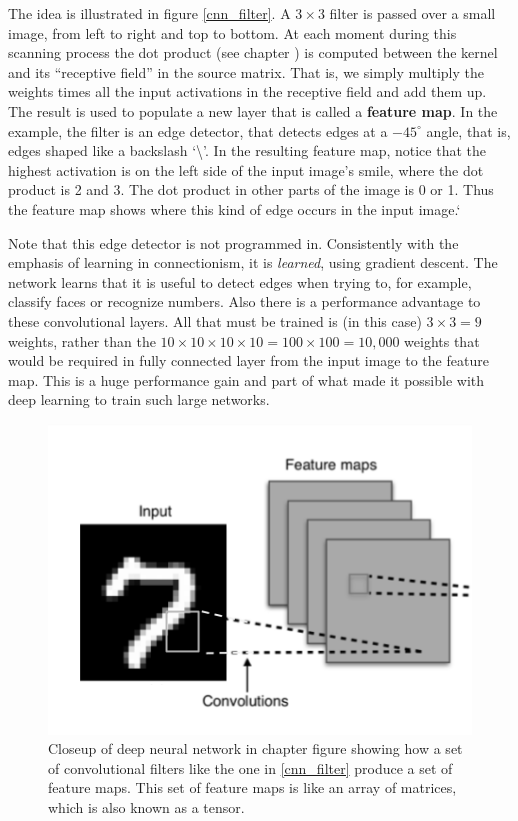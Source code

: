 The idea is illustrated in figure \ref{cnn_filter}. A $3 \times 3$ filter is passed over a small image, from left to right and top to bottom. At each moment during this scanning process the dot product (see chapter ) is computed between the kernel and its ``receptive field'' in the source matrix. That is, we simply multiply the weights times all the input activations in  the receptive field and  add them up. The result is used to populate a new layer that is called a \textbf{feature map}. In the example, the filter is an edge detector, that detects edges at a $-45^\circ$ angle, that is, edges shaped like a backslash `\textbackslash'. In the resulting feature map, notice that the highest activation is on the left side of the input image's smile, where the dot product is 2 and 3. The dot product in other parts of the image is 0 or 1. Thus the feature map shows where this kind of edge occurs in the input image.`

Note that this edge detector is not programmed in. Consistently with the emphasis of learning in connectionism, it is \emph{learned}, using gradient descent. The network learns that it is useful to  detect edges when trying to, for example, classify faces or recognize numbers. Also there is a performance advantage to these convolutional layers. All that must be trained is (in this case) $3 \times 3=9$ weights, rather than the $10 \times 10 \times 10 \times 10 = 100 \times 100 = 10,000$ weights that would be required in fully connected layer from the input image to the feature map. This is a huge performance gain and part of what  made it possible with deep learning to train such large networks.

\begin{figure}[h]
\centering
\includegraphics[scale=.4]{./images/deepNetCloseup.png}
\caption[Closeup from a creative commons image by Aphex34 at \url{https://commons.wikimedia.org/wiki/File:Typical_cnn.png} ]{Closeup of deep neural network in chapter  figure  showing how a set of convolutional filters like the one in \ref{cnn_filter} produce a set of feature maps. This set of feature maps is like an array of matrices, which is also known  as a tensor.}
\label{deep_net_closeup}
\end{figure}

